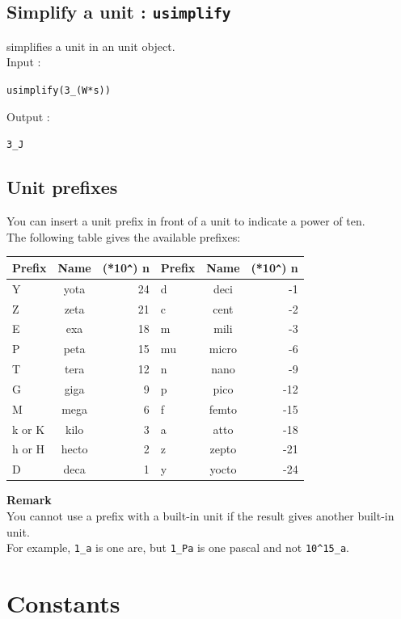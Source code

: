 \documentclass[a4paper,11pt]{book}
\begin{document}
\subsection{Simplify a unit : {\tt usimplify}}
 simplifies a unit in an unit object.\\
Input :
\begin{center}{\tt usimplify(3\_(W*s))}\end{center}
Output :
\begin{center}{\tt 3\_J}\end{center}

\subsection{Unit prefixes}
You can insert a unit prefix in front of a unit to indicate a power of ten.\\
The following table gives the available prefixes:
\begin{center}
\begin{tabular}{|l|c|r||l|c|r|}
\hline
Prefix & Name & (*10\verb|^|) n & Prefix & Name & (*10\verb|^|) n \\
\hline
Y & yota & 24 & d & deci & -1\\
Z & zeta & 21 & c & cent & -2\\
E & exa & 18 & m & mili & -3\\
P & peta & 15 & mu & micro &-6\\
T & tera & 12 & n & nano & -9\\
G & giga & 9 & p & pico & -12\\
M & mega & 6 & f & femto & -15\\
k or K & kilo & 3 & a & atto & -18\\
h or H & hecto & 2 & z & zepto & -21\\
D & deca & 1 & y & yocto &-24\\
\hline
\end{tabular}
\end{center}
{\bf Remark}\\
You cannot use a prefix with a built-in unit if the result gives another 
built-in unit.\\
For example, 
{\tt 1\_a} is one are, but {\tt 1\_Pa} is one pascal and not 
{\tt 10\verb|^|15\_a}.
 
\section{Constants}
\end{document}
